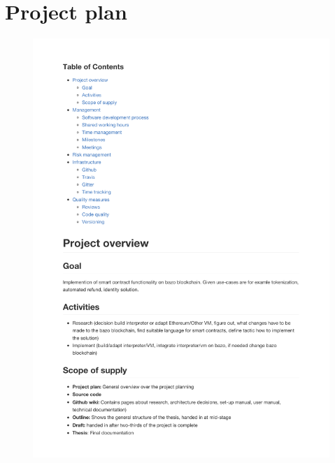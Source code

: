 \chapter{Project plan}
\begin{figure}[H]
\centering
\includegraphics[page=1, width=\textwidth,height=\textheight,keepaspectratio , origin=c]{appendix/Project-Plan.pdf}
\end{figure}
